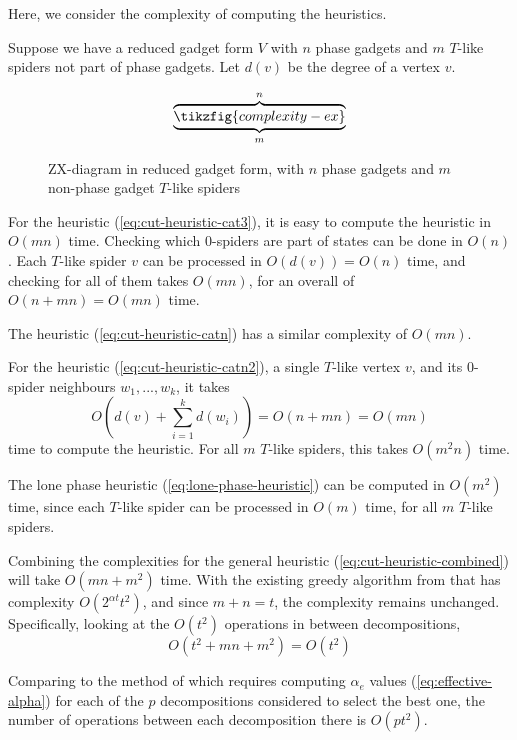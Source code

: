 Here, we consider the complexity of computing the heuristics.

Suppose we have a reduced gadget form $V$ with $n$ phase gadgets 
and $m$ $T$-like spiders not part of phase gadgets.
Let $d(v)$ be the degree of a vertex $v$.

\begin{figure}[h!]
\[\overbrace{\underbrace{\tikzfig{complexity-ex}}_m}^n\]
\caption{ZX-diagram in reduced gadget form, with $n$ phase gadgets and 
$m$ non-phase gadget $T$-like spiders}
\end{figure}

For the heuristic (\ref{eq:cut-heuristic-cat3}), it is easy to compute the heuristic in $O(mn)$ time.
Checking which 0-spiders are part of  states can be done in $O(n)$.
Each $T$-like spider $v$ can be processed in $O(d(v)) = O(n)$ time,
and checking for all of them takes $O(mn)$, for an overall of $O(n + mn) = O(mn)$ time.

The heuristic (\ref{eq:cut-heuristic-catn}) has a similar complexity of $O(mn)$.

For the  heuristic (\ref{eq:cut-heuristic-catn2}), a single $T$-like vertex $v$,
and its 0-spider neighbours $w_1,...,w_k$,
it takes 
\begin{equation}
    O\left(d(v) + \sum_{i=1}^k d(w_i)\right) = O(n+mn) = O(mn)
\end{equation}
time to compute the heuristic.
For all $m$ $T$-like spiders, this takes $O(m^2 n)$ time.

The lone phase heuristic (\ref{eq:lone-phase-heuristic}) can be computed in $O(m^2)$ time,
since each $T$-like spider can be processed in $O(m)$ time, for all $m$ $T$-like spiders.

Combining the complexities for the general heuristic (\ref{eq:cut-heuristic-combined}) 
will take $O(mn + m^2)$ time.
With the existing greedy algorithm from \cite{Kissinger2022cat,Kissinger_2022} 
that has complexity $O(2^{\alpha t}t^2)$, and since $m+n=t$, 
the complexity remains unchanged.
Specifically, looking at the $O(t^2)$ operations in between decompositions,
\begin{equation}
    O(t^2 + mn + m^2) = O(t^2)
\end{equation}

Comparing to the method of \cite{Codsi2022} which 
requires computing $\alpha_e$ values (\ref{eq:effective-alpha})
for each of the $p$ decompositions considered to select the best one, 
the number of operations between each decomposition there is $O(pt^2)$.

